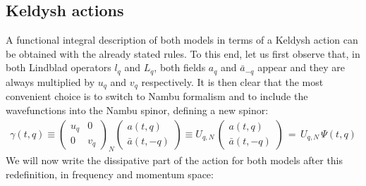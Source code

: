 \documentclass[a4paper,11pt, english]{article}
\theoremstyle{remark}
\newcommand{\nlspace}{\vskip 0.3cm}
\begin{document}
\subsection{Keldysh actions}
A functional integral description of both models in terms of a Keldysh action can be obtained with the already stated rules. To this end, let us first observe that, in both Lindblad operators $l_q$ and $L_q$, both fields $a_q$ and $\bar{a}_{-q}$ appear and they are always multiplied by $u_q$ and $v_q$ respectively. It is then clear that the most convenient choice is to switch to Nambu formalism and to include the wavefunctions into the Nambu spinor, defining a new spinor:
\begin{align}
 \gamma(t,q)\equiv\begin{pmatrix}u_q & 0 \\ 0 & v_q \end{pmatrix}_{\!\!N}\begin{pmatrix} a(t,q) \\ \bar{a}(t,-q) \end{pmatrix}\equiv U_{q,N}\,\begin{pmatrix} a(t,q) \\ \bar{a}(t,-q) \end{pmatrix}\,=\,U_{q,N} \,\Psi(t,q) \label{eq:mHS_GammaSpinorDefinition}
\end{align}\nlspace
We will now write the dissipative part of the action for both models after this redefinition, in frequency and momentum space:
\end{document}
